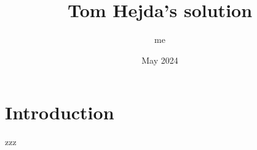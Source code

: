 \documentclass{article}
\title{Tom Hejda's solution}
\author{me}
\date{May 2024}
\begin{document}
\maketitle
\section{Introduction}
zzz
\end{document}
